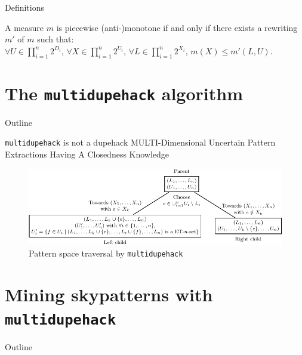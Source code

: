 \documentclass{beamer}
\newcommand{\mdh}{\texttt{multi\-dupe\-hack}}
\begin{document}
\begin{frame}[allowframebreaks]{Definitions}
\framebreak
  \begin{definition}
  A measure $m$ is piecewise (anti-)monotone if and only if there exists
  a rewriting $m'$ of $m$ such that:\\
  $\forall U \in \prod_{i = 1}^n 2^{D_i}$, $\forall X \in \prod_{i =
  1}^n 2^{U_i}$, $\forall L \in \prod_{i = 1}^n 2^{X_i}$, $m(X) \leq
  m'(L, U)$.
  \end{definition}
\end{frame}


\section{The \mdh{} algorithm}
\begin{frame}{Outline}
  \tableofcontents[currentsection]
\end{frame}

\begin{frame}{\mdh{} is not a dupehack}
  MULTI-Dimensional Uncertain Pattern Extractions Having A Closedness Knowledge
  \begin{figure}[htp]
  \centering
  \includegraphics[width=\textwidth]{tree-crop.pdf}
  \caption{Pattern space traversal by \mdh{}}
  \end{figure} 
\end{frame}



\section{Mining skypatterns with \mdh{}}
\begin{frame}{Outline}
  \tableofcontents[currentsection]
\end{frame}
\end{document}
